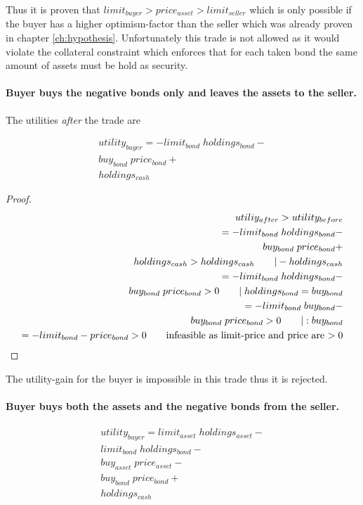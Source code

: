 \documentclass[Bachelorarbeit.tex]{subfiles}
\begin{document}
Thus it is proven that $limit_{buyer} > price_{asset} > limit_{seller}$ which is only possible if the buyer has a higher optimism-factor than the seller which was already proven in chapter \ref{ch:hypothesis}. Unfortunately this trade is not allowed as it would violate the collateral constraint which enforces that for each taken bond the same amount of assets must be hold as security. 

\paragraph{Buyer buys the negative bonds only and leaves the assets to the seller.}
The utilities \textit{after} the trade are

\begin{align*}
	utility_{buyer} = -limit_{bond} \; holdings_{bond} - \\
				buy_{bond} \; price_{bond} + \\
				holdings_{cash}
\end{align*}

\begin{proof}
\begin{align*}
	utiliy_{after} > utility_{before} 
		\\ = -limit_{bond} \; holdings_{bond} - \\
				buy_{bond} \; price_{bond} + \\
				holdings_{cash} > holdings_{cash}		\tag*{$| -holdings_{cash}$}
		\\ = -limit_{bond} \; holdings_{bond} - \\
				buy_{bond} \; price_{bond} > 0			\tag*{$| \; holdings_{bond} = buy_{bond}$}
		\\ = -limit_{bond} \; buy_{bond} - \\
			buy_{bond} \; price_{bond} > 0				\tag*{$|:buy_{bond}$}
		\\ = -limit_{bond} - price_{bond} > 0			\tag*{infeasible as limit-price and price are $> 0$}
\end{align*}
\end{proof}

The utility-gain for the buyer is impossible in this trade thus it is rejected.

\paragraph{Buyer buys both the assets and the negative bonds from the seller.}
\begin{align*}
	utility_{buyer} = limit_{asset} \; holdings_{asset} - \\
				limit_{bond} \; holdings_{bond} - \\
				buy_{asset} \; price_{asset} - \\
				buy_{bond} \; price_{bond} + \\
				holdings_{cash}
\end{align*}
\end{document}

